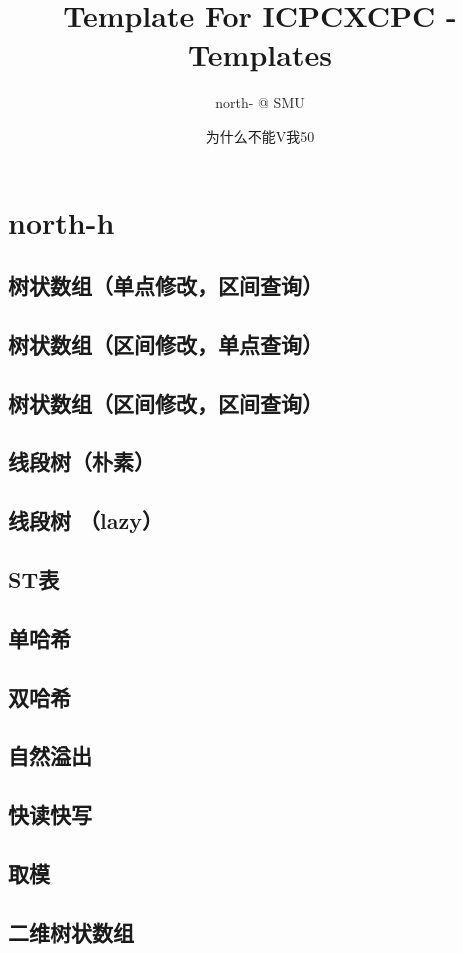 \documentclass[10pt,a4paper]{article}
\title{Template For ICPC}
\author{north- @ SMU}
\begin{document}
\title{XCPC - Templates}
\author {为什么不能V我50}
\date{}
\maketitle
\tableofcontents
\newpage
\section{north-h}
\subsection{树状数组（单点修改，区间查询）}

\subsection{树状数组（区间修改，单点查询）}

\subsection{树状数组（区间修改，区间查询）}

\subsection{线段树（朴素）}

\subsection{线段树 （lazy）}

\subsection{ST表}

\subsection{单哈希}

\subsection{双哈希}

\subsection{自然溢出}

\subsection{快读快写}

\subsection{取模}

\subsection{二维树状数组}

\end{document}

